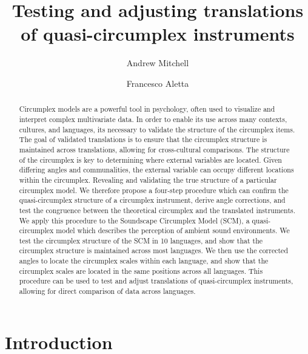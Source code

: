 \documentclass[
  authoryear,
  preprint,
  3p]{elsarticle}
\begin{document}
\begin{frontmatter}
\title{Testing and adjusting translations of quasi-circumplex
instruments}
\author[1]{Andrew Mitchell%
%
}
\author[1]{Francesco Aletta%
%
}




        
\begin{abstract}
Circumplex models are a powerful tool in psychology, often used to
visualize and interpret complex multivariate data. In order to enable
its use across many contexts, cultures, and languages, its necessary to
validate the structure of the circumplex items. The goal of validated
translations is to ensure that the circumplex structure is maintained
across translations, allowing for cross-cultural comparisons. The
structure of the circumplex is key to determining where external
variables are located. Given differing angles and communalities, the
external variable can occupy different locations within the circumplex.
Revealing and validating the true structure of a particular circumplex
model. We therefore propose a four-step procedure which can confirm the
quasi-circumplex structure of a circumplex instrument, derive angle
corrections, and test the congruence between the theoretical circumplex
and the translated instruments. We apply this procedure to the
Soundscape Circumplex Model (SCM), a quasi-circumplex model which
describes the perception of ambient sound environments. We test the
circumplex structure of the SCM in 10 languages, and show that the
circumplex structure is maintained across most languages. We then use
the corrected angles to locate the circumplex scales within each
language, and show that the circumplex scales are located in the same
positions across all languages. This procedure can be used to test and
adjust translations of quasi-circumplex instruments, allowing for direct
comparison of data across languages.
\end{abstract}





\end{frontmatter}
    \section{Introduction}\label{introduction}
\end{document}
